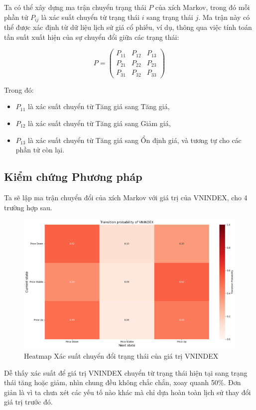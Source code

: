 Ta có thể xây dựng ma trận chuyển trạng thái \( P \) của xích Markov, trong đó mỗi phần tử \( P_{ij} \) là xác suất chuyển từ trạng thái \( i \) sang trạng thái \( j \). Ma trận này có thể được xác định từ dữ liệu lịch sử giá cổ phiếu, ví dụ, thông qua việc tính toán tần suất xuất hiện của sự chuyển đổi giữa các trạng thái:

\[
P = \begin{pmatrix} 
P_{11} & P_{12} & P_{13} \\
P_{21} & P_{22} & P_{23} \\
P_{31} & P_{32} & P_{33} 
\end{pmatrix}
\]

Trong đó:
\begin{itemize}
    \item \( P_{11} \) là xác suất chuyển từ Tăng giá sang Tăng giá,
    \item \( P_{12} \) là xác suất chuyển từ Tăng giá sang Giảm giá,
    \item \( P_{13} \) là xác suất chuyển từ Tăng giá sang Ổn định giá, và tương tự cho các phần tử còn lại.
\end{itemize}

\subsection{Kiểm chứng Phương pháp}
Ta sẽ lập ma trận chuyển đổi của xích Markov với giá trị của VNINDEX, cho 4 trường hợp sau.

\begin{figure}[H]
    \centering
    \includegraphics[width=0.9\linewidth]{images/C2_pic10.png}
    \caption{Heatmap Xác suất chuyển đổi trạng thái của giá trị VNINDEX}
    \label{fig:5.7}
\end{figure}

Dễ thấy xác suất để giá trị VNINDEX chuyển từ trạng thái hiện tại sang trạng thái tăng hoặc giảm, nhìn chung đều không chắc chắn, xoay quanh 50\%. Đơn giản là vì ta chưa xét các yếu tố nào khác mà chỉ dựa hoàn toàn lịch sử thay đổi giá trị trước đó.

